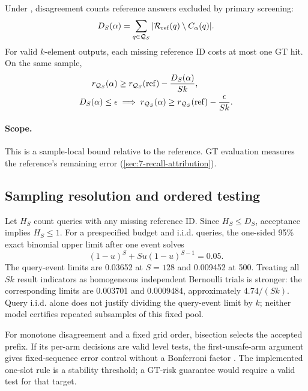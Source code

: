Under , disagreement counts reference answers
excluded by primary screening:
\begin{equation}
 D_S(\alpha)=\sum_{q\in\mathcal Q_S}
       |\mathcal R_{\rm ref}(q)\setminus C_\alpha(q)|.
 \label{eq:6-reference-coverage}
\end{equation}
For valid $k$-element outputs, each missing reference ID costs at most
one GT hit. On the same sample,
\begin{equation}
 \begin{aligned}
 r_{\mathcal Q_S}(\alpha)
 &\geq r_{\mathcal Q_S}({\rm ref})-\frac{D_S(\alpha)}{Sk},\\
 D_S(\alpha)\leq\epsilon
 &\implies r_{\mathcal Q_S}(\alpha)
       \geq r_{\mathcal Q_S}({\rm ref})-\frac{\epsilon}{Sk}.
 \end{aligned}
 \label{eq:6-relative-recall}
\end{equation}
\paragraph{Scope.}
This is a sample-local bound relative to the reference. GT evaluation
measures the reference's remaining error (\cref{sec:7-recall-attribution}).

\subsection{Sampling resolution and ordered testing}

Let $H_S$ count queries with any missing reference ID. Since $H_S\leq D_S$,
acceptance implies $H_S\leq1$. For a prespecified budget and i.i.d.
queries, the one-sided 95\% exact binomial upper limit after one event solves
\cite{nist_binomial}
\begin{equation}
 (1-u)^S+Su(1-u)^{S-1}=0.05.
 \label{eq:6-binomial-limit}
\end{equation}
The query-event limits are 0.03652 at $S=128$ and 0.009452 at 500.
Treating all $Sk$ result indicators as homogeneous independent Bernoulli
trials is stronger: the corresponding limits are 0.003701 and 0.0009484,
approximately $4.74/(Sk)$. Query i.i.d. alone does not justify dividing
the query-event limit by $k$; neither model certifies repeated subsamples
of this fixed pool.

For monotone disagreement and a fixed grid order, bisection selects the
accepted prefix. If its per-arm decisions are valid level tests, the
first-unsafe-arm argument gives fixed-sequence error control without a
Bonferroni factor \cite{learn_then_test}. The implemented one-slot rule
is a stability threshold; a GT-risk guarantee would require a valid test
for that target.

